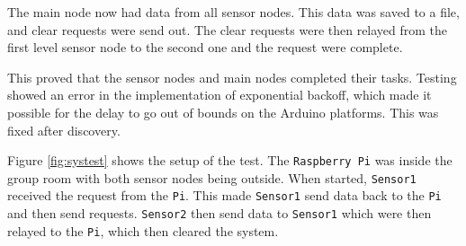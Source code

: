 The main node now had data from all sensor nodes. This data was saved to a file, and clear requests were send out. The clear requests were then relayed from the first level sensor node to the second one and the request were complete.

This proved that the sensor nodes and main nodes completed their tasks. Testing showed an error in the implementation of exponential backoff, which made it possible for the delay to go out of bounds on the Arduino platforms. This was fixed after discovery.

Figure \ref{fig:systest} shows the setup of the test. The \texttt{Raspberry Pi} was inside the group room with both sensor nodes being outside. When started, \texttt{Sensor1} received the request from the \texttt{Pi}. This made \texttt{Sensor1} send data back to the \texttt{Pi} and then send requests. \texttt{Sensor2} then send data to \texttt{Sensor1} which were then relayed to the \texttt{Pi}, which then cleared the system.
